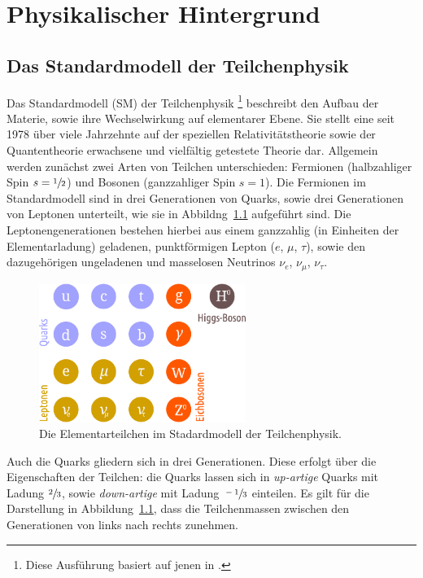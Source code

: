 \chapter{Physikalischer Hintergrund}
\label{chap:2}
%
\section{Das Standardmodell der Teilchenphysik}
%
Das Standardmodell (SM) der Teilchenphysik \footnote{Diese Ausführung basiert auf jenen in  \cite{griffiths, HalzenMartin}.} beschreibt den Aufbau der Materie, sowie ihre Wechselwirkung auf elementarer Ebene. Sie stellt eine seit 1978 \cite{griffiths} über viele Jahrzehnte auf der speziellen Relativitätstheorie sowie der Quantentheorie erwachsene und vielfältig getestete Theorie dar. Allgemein werden zunächst zwei Arten von Teilchen unterschieden: Fermionen (halbzahliger Spin $s=\sfrac{1}{2}$) und Bosonen (ganzzahliger Spin $s=1$). Die Fermionen im Standardmodell sind in drei Generationen von Quarks, sowie drei Generationen von Leptonen unterteilt, wie sie in Abbildng~\ref{fig:particles} aufgeführt sind. Die Leptonengenerationen bestehen hierbei aus einem ganzzahlig (in Einheiten der Elementarladung) geladenen, punktförmigen Lepton ($e$, $\mu$, $\tau$), sowie den dazugehörigen ungeladenen und masselosen Neutrinos $\nu_e$, $\nu_\mu$, $\nu_\tau$.
%
\begin{figure}
  \centering
      \includegraphics[width=0.6\textwidth]{Plots/SM.pdf}
  \caption{Die Elementarteilchen im Stadardmodell der Teilchenphysik.}
  \label{fig:particles}
\end{figure}
%
Auch die Quarks gliedern sich in drei Generationen. Diese erfolgt über die Eigenschaften der Teilchen: die Quarks lassen sich in \textit{up-artige} Quarks mit Ladung $\sfrac{2}{3}$, sowie \textit{down-artige} mit Ladung $\sfrac{-1}{3}$ einteilen. Es gilt für die Darstellung in Abbildung~\ref{fig:particles}, dass die Teilchenmassen zwischen den Generationen von links nach rechts zunehmen.\\
